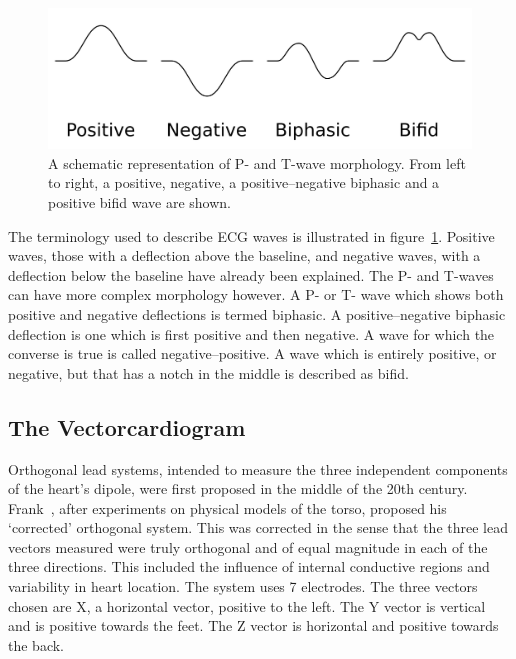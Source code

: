 \begin{figure}
\begin{center}
\includegraphics{figures/intro/ecg_waveforms}
\end{center}
\caption[ECG Morphology]{
\label{fig:intro:ecg:waveforms}
A schematic representation of P- and T-wave morphology.
From left to right, a positive, negative, a positive--negative biphasic and a
positive bifid wave are shown.
}
\end{figure}

The terminology used to describe ECG waves is illustrated in
figure~\ref{fig:intro:ecg:waveforms}.
Positive waves, those with a deflection above the baseline, and negative waves,
with a deflection below the baseline have already been explained.
The P- and T-waves can have more complex morphology however.
A P- or T- wave which shows both positive and negative deflections is termed
biphasic.
A positive--negative biphasic deflection is one which is first positive and then
negative.
A wave for which the converse is true is called negative--positive.
A wave which is entirely positive, or negative, but that has a notch in the
middle is described as bifid.

\subsection{The Vectorcardiogram}

Orthogonal lead systems, intended to measure the three independent components of
the heart's dipole, were first proposed in the middle of the 20th century.
Frank~\cite{Frank1956}, after experiments on physical models of the torso,
proposed his `corrected' orthogonal system.
This was corrected in the sense that the three lead vectors measured were
truly orthogonal and of equal magnitude in each of the three directions.
This included the influence of internal conductive regions and variability in
heart location.
The system uses 7 electrodes.
The three vectors chosen are X, a horizontal vector, positive to the left.
The Y vector is vertical and is positive towards the feet.
The Z vector is horizontal and positive towards the back.

